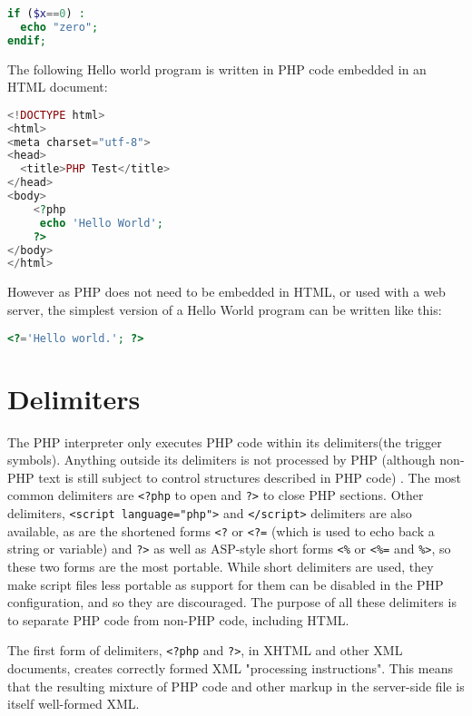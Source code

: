 \begin{lstlisting}[language=PHP]
if ($x==0) : 
  echo "zero"; 
endif;
\end{lstlisting}


The following Hello world program is written in PHP code embedded in an HTML document:

\begin{lstlisting}[language=PHP]
<!DOCTYPE html>
<html>
<meta charset="utf-8">
<head>
  <title>PHP Test</title>
</head>
<body>
	<?php
	 echo 'Hello World';
	?>
</body>
</html>
\end{lstlisting}




However as PHP does not need to be embedded in HTML, or used with a web server, the simplest version of a Hello World program can be written like this:

\begin{lstlisting}[language=PHP]
<?='Hello world.'; ?>
\end{lstlisting}

\section{Delimiters}



The PHP interpreter only executes PHP code within its delimiters(the trigger symbols). Anything outside its delimiters is not processed by PHP (although non-PHP text is still subject to control structures described in PHP code) . The most common delimiters are \texttt{<?php} to open and \texttt{?>} to close PHP sections.  Other delimiters, \texttt{<script language="php">} and \texttt{</script>} delimiters are also available, as are the shortened forms \texttt{<?} or \texttt{<?=} (which is used to echo back a string or variable) and \texttt{?>} as well as ASP-style short forms \texttt{<\%} or \texttt{<\%=} and \texttt{\%>}, so these two forms are the most portable. While short delimiters are used, they make script files less portable as support for them can be disabled in the PHP configuration, and so they are discouraged. The purpose of all these delimiters is to separate PHP code from non-PHP code, including HTML.



The first form of delimiters, \texttt{<?php} and \texttt{?>}, in XHTML and other XML documents, creates correctly formed XML "processing instructions". This means that the resulting mixture of PHP code and other markup in the server-side file is itself well-formed XML.

